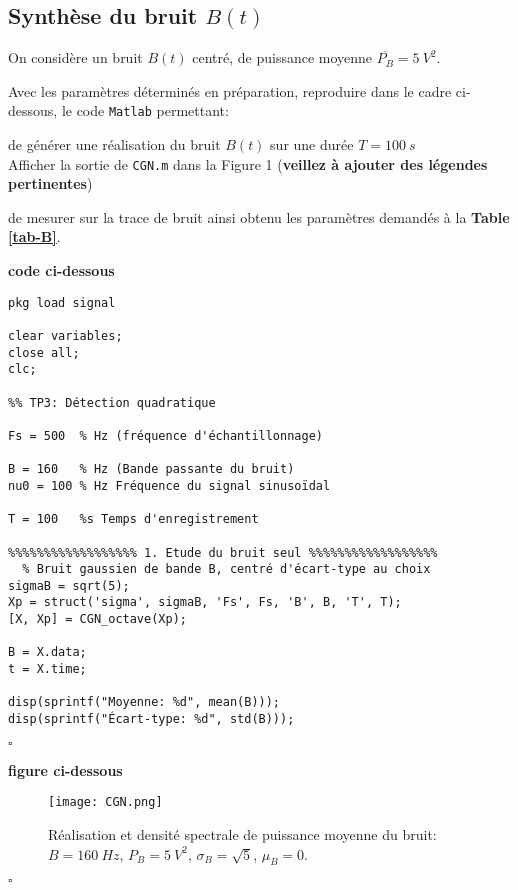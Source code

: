 \documentclass{article}
\newcommand{\debutrep}[1]{\color{blue}\begin{center} \hrulefill \textbf{ #1 } \hrulefill \end{center} }
\newcommand{\finrep}{\vspace*{5mm}\hfill $\square$\color{black}\vspace*{5mm}}
\begin{document}
\subsection{Synthèse du bruit $B(t)$}
\label{sec:bruit-synthese}

On considère un bruit $B(t)$ centré, de puissance moyenne $\overline{P_B} = 5~V^2$.

Avec les paramètres déterminés en préparation, reproduire dans le cadre ci-dessous, le code {\tt Matlab} permettant:
\begin{list}{-}{\setlength{\leftmargin}{3mm} \setlength{\labelwidth}{20mm} \setlength{\labelsep}{2mm} \setlength{\itemsep}{1mm} }
\item de générer une réalisation du bruit $B(t)$ sur une durée $T=100~s$ \\ Afficher la sortie de {\tt CGN.m} dans la Figure 1 ({\bf veillez à ajouter des légendes pertinentes})
\item de mesurer sur la trace de bruit ainsi obtenu les paramètres demandés à la \textbf{Table \ref{tab-B}}.
\end{list}

\debutrep{code ci-dessous}
\begin{verbatim}
pkg load signal

clear variables;
close all;
clc;

%% TP3: Détection quadratique

Fs = 500  % Hz (fréquence d'échantillonnage)

B = 160   % Hz (Bande passante du bruit)
nu0 = 100 % Hz Fréquence du signal sinusoïdal

T = 100   %s Temps d'enregistrement

%%%%%%%%%%%%%%%%%% 1. Etude du bruit seul %%%%%%%%%%%%%%%%%%
  % Bruit gaussien de bande B, centré d'écart-type au choix
sigmaB = sqrt(5);
Xp = struct('sigma', sigmaB, 'Fs', Fs, 'B', B, 'T', T);
[X, Xp] = CGN_octave(Xp);

B = X.data;
t = X.time;

disp(sprintf("Moyenne: %d", mean(B)));
disp(sprintf("Écart-type: %d", std(B)));
\end{verbatim}
\finrep


\debutrep{figure ci-dessous}
\begin{figure} [H]
\texttt{[image: CGN.png]}
\caption{Réalisation et densité spectrale de puissance moyenne  du bruit: $B=160~Hz$, $P_B= 5~V^2$, $\sigma_B = \sqrt{5}$, $\mu_B=0$.}
\label{fig-B}
\end{figure}
\finrep
\end{document}
